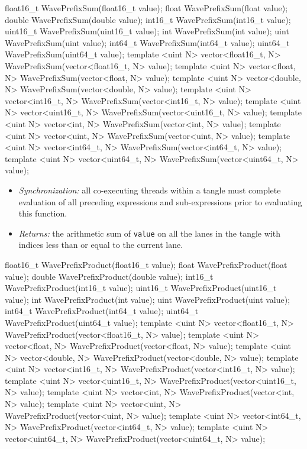 \begin{HLSL}
float16_t WavePrefixSum(float16_t value);
float WavePrefixSum(float value);
double WavePrefixSum(double value);
int16_t WavePrefixSum(int16_t value);
uint16_t WavePrefixSum(uint16_t value);
int WavePrefixSum(int value);
uint WavePrefixSum(uint value);
int64_t WavePrefixSum(int64_t value);
uint64_t WavePrefixSum(uint64_t value);
template <uint N> vector<float16_t, N> WavePrefixSum(vector<float16_t, N> value);
template <uint N> vector<float, N> WavePrefixSum(vector<float, N> value);
template <uint N> vector<double, N> WavePrefixSum(vector<double, N> value);
template <uint N> vector<int16_t, N> WavePrefixSum(vector<int16_t, N> value);
template <uint N> vector<uint16_t, N> WavePrefixSum(vector<uint16_t, N> value);
template <uint N> vector<int, N> WavePrefixSum(vector<int, N> value);
template <uint N> vector<uint, N> WavePrefixSum(vector<uint, N> value);
template <uint N> vector<int64_t, N> WavePrefixSum(vector<int64_t, N> value);
template <uint N> vector<uint64_t, N> WavePrefixSum(vector<uint64_t, N> value);
\end{HLSL}

\begin{itemize}
  \item \textit{Synchronization:} all co-executing threads within a \gls{tangle}
  must complete evaluation of all preceding expressions and sub-expressions
  prior to evaluating this function.
  \item \textit{Returns:} the arithmetic sum of \texttt{value} on all the
  \gls{lane}s in the \gls{tangle} with indices less than or equal to the current
  \gls{lane}.
\end{itemize}

\begin{HLSL}
float16_t WavePrefixProduct(float16_t value);
float WavePrefixProduct(float value);
double WavePrefixProduct(double value);
int16_t WavePrefixProduct(int16_t value);
uint16_t WavePrefixProduct(uint16_t value);
int WavePrefixProduct(int value);
uint WavePrefixProduct(uint value);
int64_t WavePrefixProduct(int64_t value);
uint64_t WavePrefixProduct(uint64_t value);
template <uint N> vector<float16_t, N> WavePrefixProduct(vector<float16_t, N> value);
template <uint N> vector<float, N> WavePrefixProduct(vector<float, N> value);
template <uint N> vector<double, N> WavePrefixProduct(vector<double, N> value);
template <uint N> vector<int16_t, N> WavePrefixProduct(vector<int16_t, N> value);
template <uint N> vector<uint16_t, N> WavePrefixProduct(vector<uint16_t, N> value);
template <uint N> vector<int, N> WavePrefixProduct(vector<int, N> value);
template <uint N> vector<uint, N> WavePrefixProduct(vector<uint, N> value);
template <uint N> vector<int64_t, N> WavePrefixProduct(vector<int64_t, N> value);
template <uint N> vector<uint64_t, N> WavePrefixProduct(vector<uint64_t, N> value);
\end{HLSL}

